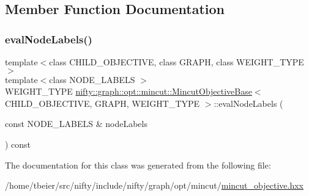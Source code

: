 \subsection{Member Function Documentation}
\mbox{\label{classnifty_1_1graph_1_1opt_1_1mincut_1_1MincutObjectiveBase_a7ff6fb377b6dd51f77aafd8a37eacebe}} 
\subsubsection{\texorpdfstring{eval\+Node\+Labels()}{evalNodeLabels()}}
{\footnotesize\ttfamily template$<$class C\+H\+I\+L\+D\+\_\+\+O\+B\+J\+E\+C\+T\+I\+VE, class G\+R\+A\+PH, class W\+E\+I\+G\+H\+T\+\_\+\+T\+Y\+PE$>$ \\
template$<$class N\+O\+D\+E\+\_\+\+L\+A\+B\+E\+LS $>$ \\
W\+E\+I\+G\+H\+T\+\_\+\+T\+Y\+PE \hyperlink{classnifty_1_1graph_1_1opt_1_1mincut_1_1MincutObjectiveBase}{nifty\+::graph\+::opt\+::mincut\+::\+Mincut\+Objective\+Base}$<$ C\+H\+I\+L\+D\+\_\+\+O\+B\+J\+E\+C\+T\+I\+VE, G\+R\+A\+PH, W\+E\+I\+G\+H\+T\+\_\+\+T\+Y\+PE $>$\+::eval\+Node\+Labels (\begin{DoxyParamCaption}\item[{const N\+O\+D\+E\+\_\+\+L\+A\+B\+E\+LS \&}]{node\+Labels }\end{DoxyParamCaption}) const\hspace{0.3cm}{\ttfamily [inline]}}



The documentation for this class was generated from the following file\+:\begin{DoxyCompactItemize}
\item 
/home/tbeier/src/nifty/include/nifty/graph/opt/mincut/\hyperlink{graph_2opt_2mincut_2mincut__objective_8hxx}{mincut\+\_\+objective.\+hxx}\end{DoxyCompactItemize}
